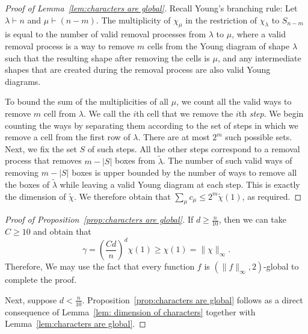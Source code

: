 \documentclass[11pt, letterpaper]{amsart}
\newcommand{\remove}[1]{}
\renewcommand\ge{\geqslant}
\renewcommand\le{\leqslant}
\begin{document}
\begin{proof}[Proof of Lemma~\ref{lem:characters are global}]
    Recall Young's branching rule: Let $\lambda \vdash n$ and $\mu \vdash (n-m)$. The multiplicity of $\chi_\mu$ in the restriction of $\chi_\lambda$ to $S_{n-m}$ is equal to the number of valid removal processes from $\lambda$ to $\mu$, where a valid removal process is a way to remove $m$ cells from the Young diagram of shape $\lambda$ such that the resulting shape after removing the cells is $\mu$, and any intermediate shapes that are created during the removal process are also valid Young diagrams.
    
    To bound the sum of the multiplicities of all $\mu$, we count all the valid ways to remove $m$ cell from $\lambda$. We call the $i$th cell that we remove the $i$th \emph{step}. We begin counting the ways by separating them according to the set of steps in which we remove a cell from the first row of $\lambda$. There are at most $2^m$ such possible sets. Next, we fix the set $S$ of such steps. All the other steps correspond to a removal process that removes $m-|S|$ boxes from $\tilde{\lambda}$. The number of such valid ways of removing $m-|S|$ boxes is upper bounded by the number of ways to remove all the boxes of $\tilde{\lambda}$ while leaving a valid Young diagram at each step. This is exactly the dimension of $\tilde{\chi}$. We therefore obtain that $\sum_\mu c_\mu \le 2^m \tilde{\chi}(1)$, as required.%
\end{proof}

\begin{proof}[Proof of Proposition~\ref{prop:characters are global}]
If $d \ge \frac{n}{10}$, then we can take $C \ge 10$ and obtain that
\[\gamma = \left(\frac{Cd}{n}\right)^d\chi(1)\ge \chi(1) = \|\chi\|_{\infty}.\]
Therefore, We may use the fact that every function $f$ is $(\|f\|_{\infty}, 2)$-global to complete the proof.

Next, suppose $d < \frac{n}{10}$. Proposition~\ref{prop:characters are global} follows as a direct consequence of Lemma~\ref{lem: dimension of characters} together with Lemma~\ref{lem:characters are global}.
\remove{We may assume without loss of generality that $d<n/10$. Otherwise, we may use the fact that every function $f$ is $(\|f\|_{\infty}, 2)$-global to complete the proof. Indeed, for $d \ge n/10$ and $C>10$ we have \[\gamma = \left(\frac{Cd}{n}\right)^d\chi(1)\ge \chi(1) = \|\chi\|_{\infty}.\]  
If $d < n/10$, then Proposition~\ref{prop:characters are global} follows as a direct consequence of Lemma~\ref{lem: dimension of characters} together with Lemma~\ref{lem:characters are global}. }
\end{proof}
\end{document}
